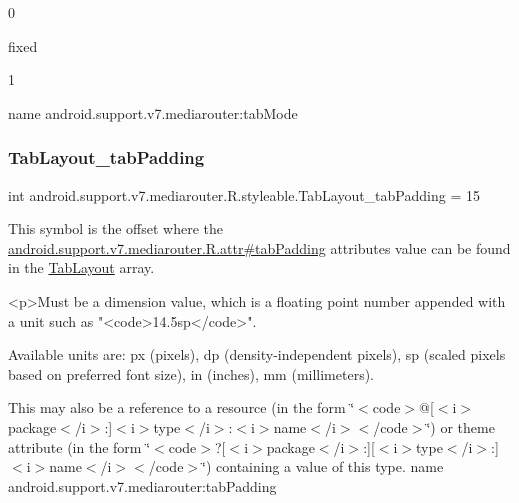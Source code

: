 0

{\ttfamily fixed}

1

name android.\+support.\+v7.\+mediarouter\+:tab\+Mode \mbox{\label{classandroid_1_1support_1_1v7_1_1mediarouter_1_1R_1_1styleable_a040d174a11be3d0c5f30bd26c52dca78}} 
\subsubsection{\texorpdfstring{Tab\+Layout\+\_\+tab\+Padding}{TabLayout\_tabPadding}}
{\footnotesize\ttfamily int android.\+support.\+v7.\+mediarouter.\+R.\+styleable.\+Tab\+Layout\+\_\+tab\+Padding = 15\hspace{0.3cm}{\ttfamily [static]}}

This symbol is the offset where the \hyperlink{classandroid_1_1support_1_1v7_1_1mediarouter_1_1R_1_1attr_ac68d44cf9810708b8ea458f8e156fa24}{android.\+support.\+v7.\+mediarouter.\+R.\+attr\#tab\+Padding} attribute\textquotesingle{}s value can be found in the \hyperlink{classandroid_1_1support_1_1v7_1_1mediarouter_1_1R_1_1styleable_a94de1350e0a902b4a974d775f2f4f25e}{Tab\+Layout} array.

\begin{DoxyVerb}      <p>Must be a dimension value, which is a floating point number appended with a unit such as "<code>14.5sp</code>".
\end{DoxyVerb}
 Available units are\+: px (pixels), dp (density-\/independent pixels), sp (scaled pixels based on preferred font size), in (inches), mm (millimeters). 

This may also be a reference to a resource (in the form \char`\"{}$<$code$>$@\mbox{[}$<$i$>$package$<$/i$>$\+:\mbox{]}$<$i$>$type$<$/i$>$\+:$<$i$>$name$<$/i$>$$<$/code$>$\char`\"{}) or theme attribute (in the form \char`\"{}$<$code$>$?\mbox{[}$<$i$>$package$<$/i$>$\+:\mbox{]}\mbox{[}$<$i$>$type$<$/i$>$\+:\mbox{]}$<$i$>$name$<$/i$>$$<$/code$>$\char`\"{}) containing a value of this type.  name android.\+support.\+v7.\+mediarouter\+:tab\+Padding \mbox{\label{classandroid_1_1support_1_1v7_1_1mediarouter_1_1R_1_1styleable_a3ac9b6469877f1873d679bfb271f796b}} 
